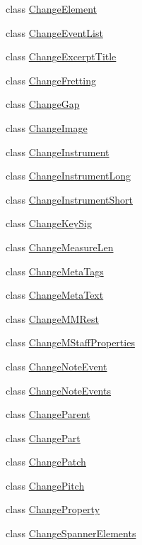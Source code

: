 \begin{DoxyCompactItemize}
class \hyperlink{class_ms_1_1_change_element}{Change\+Element}
\item 
class \hyperlink{class_ms_1_1_change_event_list}{Change\+Event\+List}
\item 
class \hyperlink{class_ms_1_1_change_excerpt_title}{Change\+Excerpt\+Title}
\item 
class \hyperlink{class_ms_1_1_change_fretting}{Change\+Fretting}
\item 
class \hyperlink{class_ms_1_1_change_gap}{Change\+Gap}
\item 
class \hyperlink{class_ms_1_1_change_image}{Change\+Image}
\item 
class \hyperlink{class_ms_1_1_change_instrument}{Change\+Instrument}
\item 
class \hyperlink{class_ms_1_1_change_instrument_long}{Change\+Instrument\+Long}
\item 
class \hyperlink{class_ms_1_1_change_instrument_short}{Change\+Instrument\+Short}
\item 
class \hyperlink{class_ms_1_1_change_key_sig}{Change\+Key\+Sig}
\item 
class \hyperlink{class_ms_1_1_change_measure_len}{Change\+Measure\+Len}
\item 
class \hyperlink{class_ms_1_1_change_meta_tags}{Change\+Meta\+Tags}
\item 
class \hyperlink{class_ms_1_1_change_meta_text}{Change\+Meta\+Text}
\item 
class \hyperlink{class_ms_1_1_change_m_m_rest}{Change\+M\+M\+Rest}
\item 
class \hyperlink{class_ms_1_1_change_m_staff_properties}{Change\+M\+Staff\+Properties}
\item 
class \hyperlink{class_ms_1_1_change_note_event}{Change\+Note\+Event}
\item 
class \hyperlink{class_ms_1_1_change_note_events}{Change\+Note\+Events}
\item 
class \hyperlink{class_ms_1_1_change_parent}{Change\+Parent}
\item 
class \hyperlink{class_ms_1_1_change_part}{Change\+Part}
\item 
class \hyperlink{class_ms_1_1_change_patch}{Change\+Patch}
\item 
class \hyperlink{class_ms_1_1_change_pitch}{Change\+Pitch}
\item 
class \hyperlink{class_ms_1_1_change_property}{Change\+Property}
\item 
class \hyperlink{class_ms_1_1_change_spanner_elements}{Change\+Spanner\+Elements}

\end{DoxyCompactItemize}
